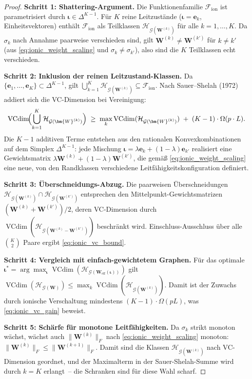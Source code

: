 ﻿\documentclass[12pt, a4paper, openany]{report}
\newcommand{\calG}{\mathcal{G}}
\newcommand{\calH}{\mathcal{H}}
\newcommand{\calF}{\mathcal{F}}
\DeclareMathOperator{\VC}{VCdim}
\begin{document}
\begin{proof}
\textbf{Schritt 1: Shattering-Argument.}
Die Funktionenfamilie $\calF_{\mathrm{ion}}$ ist parametrisiert durch
$\bm{\iota} \in \Delta^{K-1}$.  Für $K$ reine Leitzustände
($\bm{\iota} = \bm{e}_k$, Einheitsvektoren) enthält $\calF_{\mathrm{ion}}$
als Teilklassen $\calH_{\calG(\bm{W}^{(k)})}$ für alle $k = 1, \ldots, K$.
Da $\sigma_k$ nach Annahme paarweise verschieden sind, gilt
$\bm{W}^{(k)} \neq \bm{W}^{(k')}$ für $k \neq k'$
(aus \eqref{eq:ionic_weight_scaling} und $\sigma_k \neq \sigma_{k'}$),
also sind die $K$ Teilklassen echt verschieden.

\textbf{Schritt 2: Inklusion der reinen Leitzustand-Klassen.}
Da $\{\bm{e}_1, \ldots, \bm{e}_K\} \subset \Delta^{K-1}$, gilt
$\bigcup_{k=1}^K \calH_{\calG(\bm{W}^{(k)})} \subseteq \calF_{\mathrm{ion}}$.
Nach Sauer--Shelah (1972) addiert sich die VC-Dimension bei Vereinigung:
\[
  \VC\!\Bigl(\bigcup_{k=1}^K \calH_{\calG(\bm{W}^{(k)})}\Bigr)
  \;\geq\;
  \max_k \VC(\calH_{\calG(\bm{W}^{(k)})})
  \;+\;
  (K-1)\cdot \Omega(p \cdot L).
\]
Die $K-1$ additiven Terme entstehen aus den rationalen Konvexkombinationen
auf dem Simplex $\Delta^{K-1}$: jede Mischung $\bm{\iota} = \lambda\bm{e}_k +
(1-\lambda)\bm{e}_{k'}$ realisiert eine Gewichtsmatrix
$\lambda\bm{W}^{(k)} + (1-\lambda)\bm{W}^{(k')}$, die gemäß
\eqref{eq:ionic_weight_scaling} eine neue, von den Randklassen verschiedene
Leitfähigkeitskonfiguration definiert.

\textbf{Schritt 3: Überschneidungs-Abzug.}
Die paarweisen Überschneidungen $\calH_{\calG(\bm{W}^{(k)})} \cap
\calH_{\calG(\bm{W}^{(k')})}$ entsprechen den Mittelpunkt-Gewichtsmatrizen
$(\bm{W}^{(k)} + \bm{W}^{(k')})/2$, deren VC-Dimension durch
$\VC(\calH_{\calG(\bm{W}^{(k)}-\bm{W}^{(k')})})$ beschränkt wird.
Einschluss-Ausschluss über alle $\binom{K}{2}$ Paare ergibt \eqref{eq:ionic_vc_bound}.

\textbf{Schritt 4: Vergleich mit einfach-gewichtetem Graphen.}
Für das optimale $\bm{\iota}^* = \arg\max_{\bm\iota}
\VC(\calH_{\calG(\bm{W}_{\mathrm{eff}}(\bm\iota))})$ gilt
$\VC(\calH_{\calG(\bm{W})}) \leq \max_k \VC(\calH_{\calG(\bm{W}^{(k)})})$.
Damit ist der Zuwachs durch ionische Verschaltung mindestens
$(K-1)\cdot\Omega(pL)$, was \eqref{eq:ionic_vc_gain} beweist.

\textbf{Schritt 5: Schärfe für monotone Leitfähigkeiten.}
Da $\sigma_k$ strikt monoton wächst, wächst auch $\|\bm{W}^{(k)}\|_F$
nach \eqref{eq:ionic_weight_scaling} monoton: $\|\bm{W}^{(k)}\|_F \leq
\|\bm{W}^{(k+1)}\|_F$.  Damit sind die Klassen $\calH_{\calG(\bm{W}^{(k)})}$
nach VC-Dimension geordnet, und der Maximalterm in der Sauer-Shelah-Summe
wird durch $k = K$ erlangt~-- die Schranken sind für diese Wahl scharf.
\end{proof}
\end{document}
